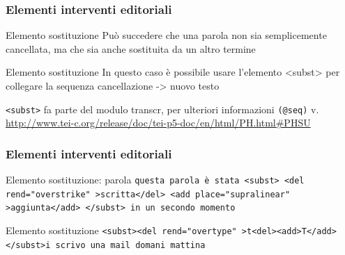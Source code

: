 \begin{frame}
    \frametitle{Elementi interventi editoriali}
    \addtocounter{nframe}{1}
    

    \begin{block}{Elemento sostituzione}
        Può succedere che una parola non sia semplicemente cancellata, ma che sia anche sostituita da un altro termine
    \end{block}
    \begin{block}{Elemento sostituzione}
        In questo caso è possibile usare l’elemento <subst> per collegare la sequenza cancellazione -> nuovo testo
    \end{block}
    \texttt{<subst>} fa parte del modulo transcr, per ulteriori informazioni \texttt{(@seq)} v. \url{http://www.tei-c.org/release/doc/tei-p5-doc/en/html/PH.html\#PHSU}
\end{frame}


\begin{frame}
    \frametitle{Elementi interventi editoriali}
    \addtocounter{nframe}{1}
    

    \begin{block}{Elemento sostituzione: parola}
        \texttt{questa parola è stata <subst> <del rend="overstrike" >scritta</del> <add place="supralinear" >aggiunta</add> </subst> in un secondo momento}
    \end{block}

    \begin{block}{Elemento sostituzione}
        \texttt{<subst><del rend="overtype" >t<del><add>T</add></subst>i scrivo una     mail domani mattina}
    \end{block}
   
\end{frame}




